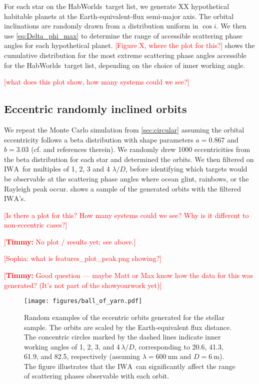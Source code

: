 \documentclass[
    usenatbib,
]{mnras}
\newcommand{\todo}[1]{\textcolor{red}{[#1]}}
\newcommand{\timmy}[1]{\textcolor{red}{[\textbf{Timmy:} #1]}} %
\newcommand{\IWA}{\ensuremath{\mathrm{IWA}}}
\newcommand{\hwo}{HabWorlds}
\begin{document}
For each star on the \hwo\ target list, we generate XX hypothetical habitable planets at the Earth-equivalent-flux semi-major axis. 
%
The orbital inclinations are randomly drawn from a distribution uniform in $\cos i$. 
%
We then use \cref{eq:Delta_phi_max} to determine the range of accessible scattering phase angles for each hypothetical planet.
%
\todo{Figure X, where the plot for this?} shows the cumulative distribution for the most extreme scattering phase angles accessible for the \hwo\ target list, depending on the choice of inner working angle.  

\todo{what does this plot show, how many systems could we see?}


\subsection{Eccentric randomly inclined orbits}
\label{sec:eccentric}
We repeat the Monte Carlo simulation from \cref{sec:circular} assuming the orbital eccentricity follows a beta distribution with shape parameters $a=0.867$ and $b=3.03$ (cf. \citet{Guimond_2019} and references therein). 
%
We randomly drew 1000 eccentricities from the beta distribution for each star and determined the orbits. 
%
We then filtered on \IWA\ for multiples of 1, 2, 3 and 4 $\lambda / D$, before identifying which targets would be observable at the scattering phase angles where ocean glint, rainbows, or the Rayleigh peak occur. 
%
 shows a sample of the generated orbits with the filtered \IWA's. 
%

\todo{Is there a plot for this? How many systems could we see? Why is it different to non-eccentric cases?}

\timmy{No plot / results yet; see above.}

\todo{Sophia: what is features\_plot\_peak.png showing?}

\timmy{Good question --- maybe Matt or Max know how the data for this was generated? (It's not part of the showyourwork yet)}

\begin{figure*}
    \centering
    \texttt{[image: figures/ball\_of\_yarn.pdf]}  
    \caption{
        Random examples of the eccentric orbits generated for the stellar sample.
        The orbits are scaled by the Earth-equivalent flux distance. 
        The concentric circles marked by the dashed lines indicate inner working angles of 1, 2, 3, and 4\,$\lambda / D$, corresponding to 20.6, 41.3, 61.9, and \SI{82.5}{\mas}, respectively (assuming $\lambda = \SI{600}{\nano\meter}$ and $D = \SI{6}{\meter}$).
        The figure illustrates that the \IWA\ can significantly affect the range of scattering phases observable with each orbit.
    }
    \label{fig:ball-o-yarn}
\end{figure*}
 
\end{document}

